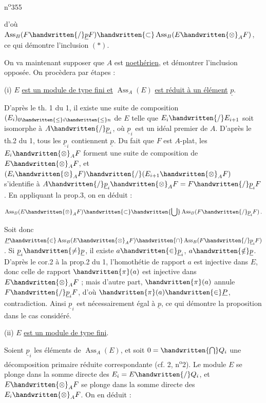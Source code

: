 \noindent\hfill n\textsuperscript{o}355

d'où $\operatorname{Ass}_B(F\handwritten{/}\underline p F)\handwritten{\subset}\operatorname{Ass}_B(E\handwritten{\otimes}_A F)$, ce qui démontre l'inclusion $(\ast)$.

On va maintenant supposer que $A$ est \uline{noethérien}, et démontrer l'inclusion opposée. On procèdera par étapes :

(i) $E$ \uline{est un module de type fini et} $\operatorname{Ass}_A(E)$ \uline{est réduit à un élément} $\underline p$.

D'après le th. 1 du \handwritten{\S}{} 1, il existe une suite de composition $(E_i)_{0\handwritten{\leq} i\handwritten{\leq} n}$ de $E$ telle que $E_i\handwritten{/}E_{i+1}$ soit isomorphe à $A\handwritten{/}\underline p_i$, où $\underline p_i$ est un idéal premier de $A$. D'après le th.2 du \handwritten{\S}{} 1, tous les $\underline p_i$ contiennent $\underline p$. Du fait que $F$ est $A$-plat, les $E_i\handwritten{\otimes}_A F$ forment une suite de composition de $E\handwritten{\otimes}_A F$, et $(E_i\handwritten{\otimes}_A F)\handwritten{/}(E_{i+1}\handwritten{\otimes}_A F)$ s'identifie à $A\handwritten{/}\underline p_i\handwritten{\otimes}_A F=F\handwritten{/}\underline p_i F$. En appliquant la prop.3, on en déduit :

\[
\operatorname{Ass}_B(E\handwritten{\otimes}_A F)\handwritten{\subset}\handwritten{\bigcup}\operatorname{Ass}_B(F\handwritten{/}\underline p_i F)\,.
\]

Soit donc $\underline P\handwritten{\in}\operatorname{Ass}_B(E\handwritten{\otimes}_A F)\handwritten{\cap}\operatorname{Ass}_B(F\handwritten{/}\underline p_i F)$. Si $\underline p_i\handwritten{\ne}\underline p$, il existe $a\handwritten{\in}\underline p_i$, $a\handwritten{\notin}\underline p$. D'après le cor.2 à la prop.2 du \handwritten{\S}{} 1, l'homothétie de rapport $a$ est injective dans $E$, donc celle de rapport $\handwritten{\pi}(a)$ est injective dans $E\handwritten{\otimes}_A F$ ; mais d'autre part, $\handwritten{\pi}(a)$ annule $F\handwritten{/}\underline p_i F$, d'où $\handwritten{\pi}(a)\handwritten{\in}\underline P$, contradiction. Ainsi $\underline p_i$ est nécessairement égal à $\underline p$, ce qui démontre la proposition dans le cas considéré.

(ii) $E$ \uline{est un module de type fini}.

Soient $\underline p_i$ les éléments de $\operatorname{Ass}_A(E)$, et soit $0=\handwritten{\bigcap} Q_i$ une décomposition primaire réduite correspondante (cf. \handwritten{\S}{} 2, n\textsuperscript{o}2). Le module $E$ se plonge dans la somme directe des $E_i=E\handwritten{/}Q_i$, et $E\handwritten{\otimes}_A F$ se plonge dans la somme directe des $E_i\handwritten{\otimes}_A F$. On en déduit :


